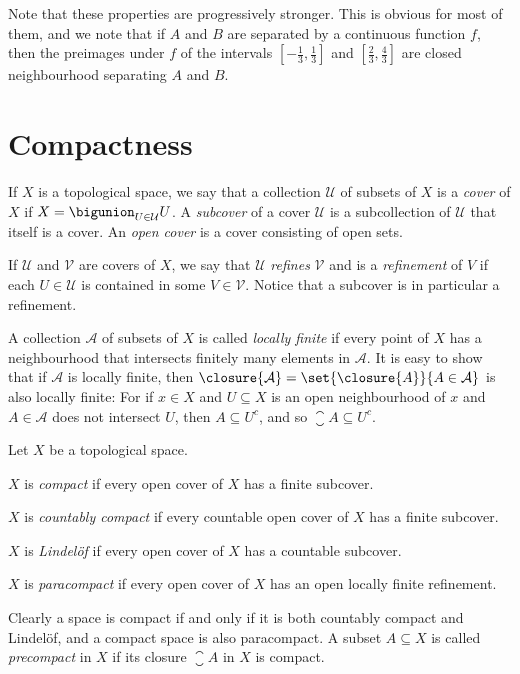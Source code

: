 \documentclass[article, a4paper, 11pt, oneside]{memoir}
\numberwithin{equation}{chapter}
\newcommand{\calU}{\mathcal{U}}
\newcommand{\calV}{\mathcal{V}}
\begin{document}
Note that these properties are progressively stronger. This is obvious for most of them, and we note that if $A$ and $B$ are separated by a continuous function $f$, then the preimages under $f$ of the intervals $[-\tfrac{1}{3},\tfrac{1}{3}]$ and $[\tfrac{2}{3}, \tfrac{4}{3}]$ are closed neighbourhood separating $A$ and $B$.


\section{Compactness}

\newcommand{\calA}{\mathcal{A}}

If $X$ is a topological space, we say that a collection $\calU$ of subsets of $X$ is a \emph{cover} of $X$ if $X = \bigunion_{U \in \calU} U$. A \emph{subcover} of a cover $\calU$ is a subcollection of $\calU$ that itself is a cover. An \emph{open cover} is a cover consisting of open sets.

If $\calU$ and $\calV$ are covers of $X$, we say that $\calU$ \emph{refines} $\calV$ and is a \emph{refinement} of $V$ if each $U \in \calU$ is contained in some $V \in \calV$. Notice that a subcover is in particular a refinement.

A collection $\calA$ of subsets of $X$ is called \emph{locally finite} if every point of $X$ has a neighbourhood that intersects finitely many elements in $\calA$. It is easy to show that if $\calA$ is locally finite, then $\closure{\calA} = \set{\closure{A}}{A \in \calA}$ is also locally finite: For if $x \in X$ and $U \subseteq X$ is an open neighbourhood of $x$ and $A \in \calA$ does not intersect $U$, then $A \subseteq U^c$, and so $\closure{A} \subseteq U^c$.

\begin{definition}
    Let $X$ be a topological space.
    \begin{enumdef}
        \item $X$ is \emph{compact} if every open cover of $X$ has a finite subcover.
        
        \item $X$ is \emph{countably compact} if every countable open cover of $X$ has a finite subcover.

        \item $X$ is \emph{Lindelöf} if every open cover of $X$ has a countable subcover.

        \item $X$ is \emph{paracompact} if every open cover of $X$ has an open locally finite refinement.
    \end{enumdef}
\end{definition}
%
Clearly a space is compact if and only if it is both countably compact and Lindelöf, and a compact space is also paracompact. A subset $A \subseteq X$ is called \emph{precompact} in $X$ if its closure $\closure{A}$ in $X$ is compact.
\end{document}
